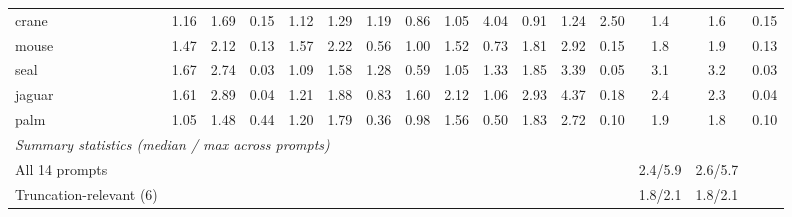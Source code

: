 \begin{table}[t]
{\begin{tabular}{l | ccc | ccc | ccc | ccc | cc c}
crane & 1.16 & 1.69 & 0.15 & 1.12 & 1.29 & 1.19 & 0.86 & 1.05 & 4.04 & 0.91 & 1.24 & 2.50 & 1.4 & 1.6 & 0.15 \\
mouse & 1.47 & 2.12 & 0.13 & 1.57 & 2.22 & 0.56 & 1.00 & 1.52 & 0.73 & 1.81 & 2.92 & 0.15 & 1.8 & 1.9 & 0.13 \\
seal & 1.67 & 2.74 & 0.03 & 1.09 & 1.58 & 1.28 & 0.59 & 1.05 & 1.33 & 1.85 & 3.39 & 0.05 & 3.1 & 3.2 & 0.03 \\
jaguar & 1.61 & 2.89 & 0.04 & 1.21 & 1.88 & 0.83 & 1.60 & 2.12 & 1.06 & 2.93 & 4.37 & 0.18 & 2.4 & 2.3 & 0.04 \\
palm & 1.05 & 1.48 & 0.44 & 1.20 & 1.79 & 0.36 & 0.98 & 1.56 & 0.50 & 1.83 & 2.72 & 0.10 & 1.9 & 1.8 & 0.10 \\
\midrule
\multicolumn{16}{l}{\textit{Summary statistics (median / max across prompts)}} \\
All 14 prompts & \multicolumn{12}{r|}{} & 2.4/5.9 & 2.6/5.7 & \\
Truncation-relevant (6) & \multicolumn{12}{r|}{} & 1.8/2.1 & 1.8/2.1 & \\
\bottomrule
\end{tabular}}%
\end{table}